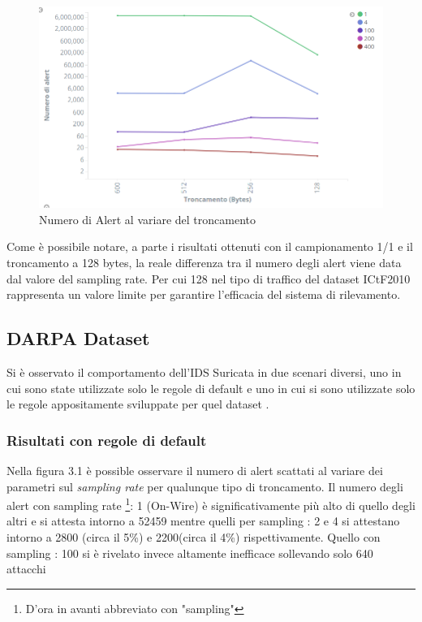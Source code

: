 \documentclass[12pt,a4paper,openright,twoside]{report}
\begin{document}
\begin{figure}[h!]
\begin{center}                          %
  \includegraphics[width=\textwidth]{images/ICTF--tunc-vs-samp.png}
  \caption{Numero di Alert al variare del troncamento}
  \label{}
\end{center}
\end{figure}

Come \`e possibile notare, a parte i risultati ottenuti con il campionamento 1/1 e il
troncamento a 128 bytes, la reale differenza tra il numero degli alert viene data dal
valore del sampling rate. Per cui 128 nel tipo di traffico del dataset ICtF2010
rappresenta un valore limite per garantire l'efficacia del sistema di rilevamento.

\newpage
\subsection{DARPA Dataset}

Si \`e osservato il comportamento dell'IDS Suricata in due scenari diversi,
uno in cui sono state utilizzate solo le regole di default e uno in cui si
sono utilizzate solo le regole appositamente sviluppate per quel dataset \cite{EXP15}.

\subsubsection{Risultati con regole di default}

Nella figura 3.1 \`e possible osservare il numero di alert scattati al variare dei
parametri sul {\it sampling rate} per qualunque tipo di troncamento. Il numero degli
alert con sampling rate \footnote{D'ora in avanti abbreviato con "sampling"}: 1 (On-Wire)
\`e significativamente pi\`u alto di quello degli altri e
si attesta intorno a 52459 mentre quelli per sampling : 2 e 4 si attestano intorno a
2800 (circa il 5\%) e 2200(circa il 4\%) rispettivamente. Quello con sampling : 100 si \`e rivelato invece altamente
inefficace sollevando solo 640 attacchi
\end{document}
